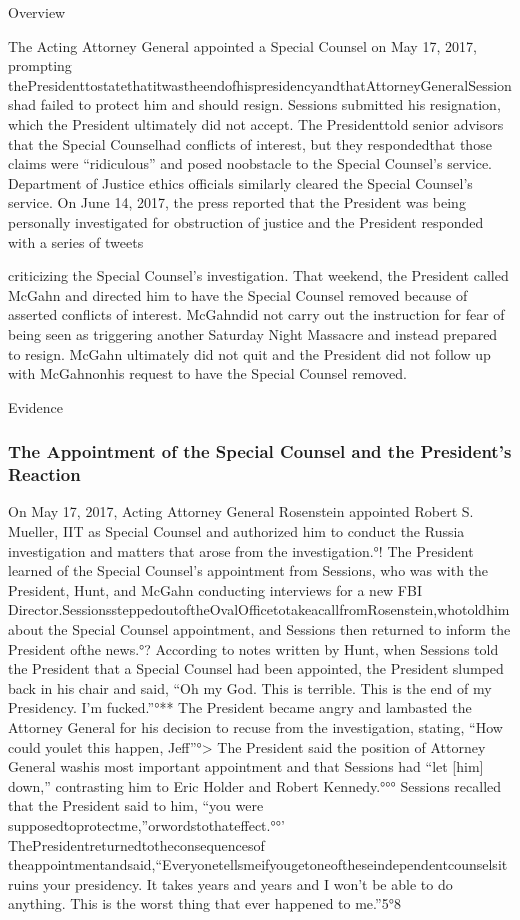 {Overview

The Acting Attorney General appointed a Special Counsel on May 17, 2017, prompting thePresidenttostatethatitwastheendofhispresidencyandthatAttorneyGeneralSessionshad failed to protect him and should resign.
Sessions submitted his resignation, which the President ultimately did not accept.
The Presidenttold senior advisors that the Special Counselhad conflicts of interest, but they respondedthat those claims were “ridiculous” and posed noobstacle to the Special Counsel’s service.
Department of Justice ethics officials similarly cleared the Special Counsel’s service.
On June 14, 2017, the press reported that the President was being personally investigated for obstruction of justice and the President responded with a series of tweets

criticizing the Special Counsel’s investigation.
That weekend, the President called McGahn and directed him to have the Special Counsel removed because of asserted conflicts of interest.
McGahndid not carry out the instruction for fear of being seen as triggering another Saturday Night Massacre and instead prepared to resign.
McGahn ultimately did not quit and the President did not follow up with McGahnonhis request to have the Special Counsel removed.

Evidence

\subsubsection{The Appointment of the Special Counsel and the President's Reaction}

On May 17, 2017, Acting Attorney General Rosenstein appointed Robert S. Mueller, IIT as Special Counsel and authorized him to conduct the Russia investigation and matters that arose from the investigation.°!
The President learned of the Special Counsel’s appointment from Sessions, who was with the President, Hunt, and McGahn conducting interviews for a new FBI Director.SessionssteppedoutoftheOvalOfficetotakeacallfromRosenstein,whotoldhim about the Special Counsel appointment, and Sessions then returned to inform the President ofthe news.°?
According to notes written by Hunt, when Sessions told the President that a Special Counsel had been appointed, the President slumped back in his chair and said, “Oh my God.
This is terrible.
This is the end of my Presidency.
I’m fucked.”°**
The President became angry and lambasted the Attorney General for his decision to recuse from the investigation, stating, “How could youlet this happen, Jeff”°>
The President said the position of Attorney General washis most important appointment and that Sessions had “let [him] down,” contrasting him to Eric Holder and Robert Kennedy.°°°
Sessions recalled that the President said to him, “you were supposedtoprotectme,”orwordstothateffect.°°’
ThePresidentreturnedtotheconsequencesof theappointmentandsaid,“Everyonetellsmeifyougetoneoftheseindependentcounselsitruins
your presidency.
It takes years and years and I won’t be able to do anything. This is the worst thing that ever happened to me.”5°8

}

